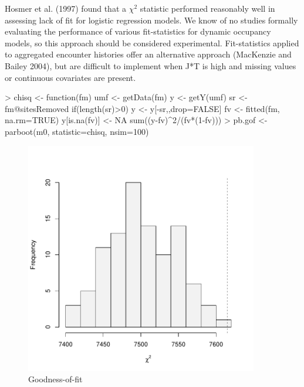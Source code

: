 \documentclass[12pt]{article}
\renewenvironment{Schunk}{\vspace{\topsep}}{\vspace{\topsep}}
\begin{document}
Hosmer et al. (1997) found that a $\chi^2$ statistic performed
reasonably well in assessing lack of fit for logistic regression
models. We know of no studies formally
evaluating the performance of various fit-statistics for dynamic
occupancy models, so this approach should be
considered experimental. Fit-statistics applied to aggregated
encounter histories offer an alternative approach (MacKenzie and
Bailey 2004), but are difficult to implement when J*T is high and
missing values or continuous covariates are present.


\begin{small}

\begin{Schunk}
\begin{Sinput}
> chisq <- function(fm) {
     umf <- getData(fm)
     y <- getY(umf)
     sr <- fm@sitesRemoved
     if(length(sr)>0)
         y <- y[-sr,,drop=FALSE]
     fv <- fitted(fm, na.rm=TRUE)
     y[is.na(fv)] <- NA
     sum((y-fv)^2/(fv*(1-fv)))
     }
> pb.gof <- parboot(m0, statistic=chisq, nsim=100)
\end{Sinput}
\end{Schunk}

\end{small}


\begin{figure}[!h]
\centering
\includegraphics[width=4in,height=4in]{colext-gof.pdf}
\caption{Goodness-of-fit}
\label{fig:gof}
\end{figure}
\end{document}

